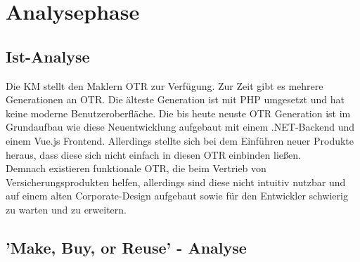 \section{Analysephase}
\label{analysephase}

\subsection{Ist-Analyse}
\label{ist}
\begin{comment}
evtl alte otrs mit nutzwertanalyse vergleichen?
\end{comment}
Die \ac{KM} stellt den Maklern \ac{OTR} zur Verfügung. Zur Zeit gibt es mehrere Generationen an \ac{OTR}. Die älteste Generation ist mit PHP umgesetzt und hat keine moderne Benutzeroberfläche. Die bis heute neuste \ac{OTR} Generation ist im Grundaufbau wie diese Neuentwicklung aufgebaut mit einem .NET-Backend und einem Vue.js Frontend. Allerdings stellte sich bei dem Einführen neuer Produkte heraus, dass diese sich nicht einfach in diesen \ac{OTR} einbinden ließen. \\
Demnach existieren funktionale \ac{OTR}, die beim Vertrieb von Versicherungsprodukten helfen, allerdings sind diese nicht intuitiv nutzbar und auf einem alten Corporate-Design aufgebaut sowie für den Entwickler schwierig zu warten und zu erweitern.

\subsection{'Make, Buy, or Reuse' - Analyse}
\label{makeOrBuy}

